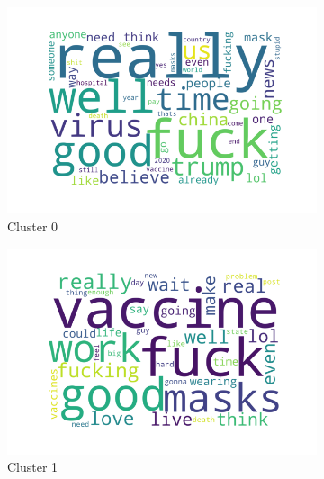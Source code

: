 \begin{figure}
    \centering
    \begin{subfigure}[b]{0.49\textwidth}
        \centering
        \includegraphics[width=\textwidth]{results/TopicDetection/en/cluster0.png}
        \caption{Cluster 0}
        \label{fig:en_c0}
    \end{subfigure}
    \hfill
    \begin{subfigure}[b]{0.49\textwidth}
        \centering
        \includegraphics[width=\textwidth]{results/TopicDetection/en/cluster2.png}
        \caption{Cluster 1}
        \label{fig:en_c1}
    \end{subfigure}
    \hfill
    \begin{subfigure}[b]{0.49\textwidth}
        \centering

\end{subfigure}
\end{figure}
